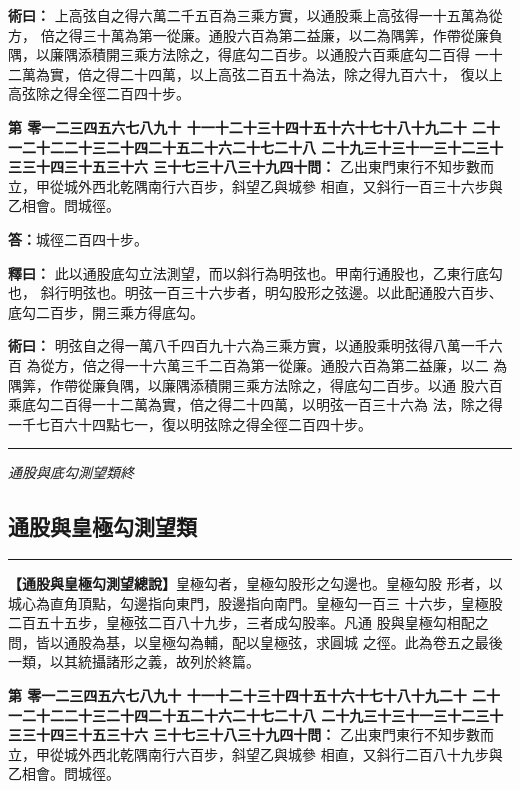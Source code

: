 \documentclass[11pt,a4paper]{article}
\newcommand{\longline}{\noindent\rule{\textwidth}{0.4pt}}
\newcounter{probnum}
\newcommand{\chnum}[1]{%
  \ifcase#1 零\or 一\or 二\or 三\or 四\or 五\or 六\or 七\or 八\or 九\or 十\or
    十一\or 十二\or 十三\or 十四\or 十五\or 十六\or 十七\or 十八\or 十九\or 二十\or
    二十一\or 二十二\or 二十三\or 二十四\or 二十五\or 二十六\or 二十七\or 二十八\or
    二十九\or 三十\or 三十一\or 三十二\or 三十三\or 三十四\or 三十五\or 三十六\or
    三十七\or 三十八\or 三十九\or 四十\fi}
\newcommand{\problem}[1]{\stepcounter{probnum}\par\noindent\textbf{第\chnum{\value{probnum}}問：}#1\par}
\newcommand{\answer}[1]{\par\noindent\textbf{答：}#1\par}
\newcommand{\shiyi}[1]{\par\noindent\textbf{釋曰：}#1\par}
\newcommand{\shuyue}[1]{\par\noindent\textbf{術曰：}#1\par}
\begin{document}
\shuyue{
上高弦自之得六萬二千五百為三乘方實，以通股乘上高弦得一十五萬為從方，
倍之得三十萬為第一從廉。通股六百為第二益廉，以二為隅筭，作帶從廉負
隅，以廉隅添積開三乘方法除之，得底勾二百步。以通股六百乘底勾二百得
一十二萬為實，倍之得二十四萬，以上高弦二百五十為法，除之得九百六十，
復以上高弦除之得全徑二百四十步。
}

\vspace{0.3cm}
\problem{
乙出東門東行不知步數而立，甲從城外西北乾隅南行六百步，斜望乙與城參
相直，又斜行一百三十六步與乙相會。問城徑。
}

\answer{城徑二百四十步。}

\shiyi{
此以通股底勾立法測望，而以斜行為明弦也。甲南行通股也，乙東行底勾也，
斜行明弦也。明弦一百三十六步者，明勾股形之弦邊。以此配通股六百步、
底勾二百步，開三乘方得底勾。
}

\shuyue{
明弦自之得一萬八千四百九十六為三乘方實，以通股乘明弦得八萬一千六百
為從方，倍之得一十六萬三千二百為第一從廉。通股六百為第二益廉，以二
為隅筭，作帶從廉負隅，以廉隅添積開三乘方法除之，得底勾二百步。以通
股六百乘底勾二百得一十二萬為實，倍之得二十四萬，以明弦一百三十六為
法，除之得一千七百六十四點七一，復以明弦除之得全徑二百四十步。
}

\vspace{0.5cm}
\longline
\begin{center}
\textit{通股與底勾測望類終}
\end{center}

\newpage
\setcounter{probnum}{0}

\subsection*{通股與皇極勾測望類}
\vspace{0.3cm}
\longline
\vspace{0.3cm}

\noindent
\textbf{【通股與皇極勾測望總說】}皇極勾者，皇極勾股形之勾邊也。皇極勾股
形者，以城心為直角頂點，勾邊指向東門，股邊指向南門。皇極勾一百三
十六步，皇極股二百五十五步，皇極弦二百八十九步，三者成勾股率。凡通
股與皇極勾相配之問，皆以通股為基，以皇極勾為輔，配以皇極弦，求圓城
之徑。此為卷五之最後一類，以其統攝諸形之義，故列於終篇。

\problem{
乙出東門東行不知步數而立，甲從城外西北乾隅南行六百步，斜望乙與城參
相直，又斜行二百八十九步與乙相會。問城徑。
}
\end{document}
